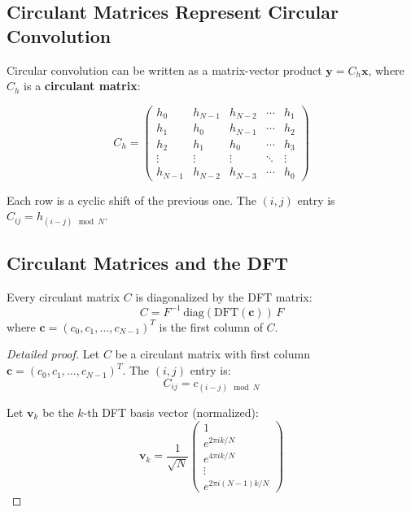 \begin{notechapter}
\subsection{Circulant Matrices Represent Circular Convolution}

Circular convolution can be written as a matrix-vector product 
$\mathbf{y} = C_h \mathbf{x}$, where $C_h$ is a \textbf{circulant 
matrix}:

\begin{equation}
C_h = \begin{pmatrix}
h_0 & h_{N-1} & h_{N-2} & \cdots & h_1 \\
h_1 & h_0 & h_{N-1} & \cdots & h_2 \\
h_2 & h_1 & h_0 & \cdots & h_3 \\
\vdots & \vdots & \vdots & \ddots & \vdots \\
h_{N-1} & h_{N-2} & h_{N-3} & \cdots & h_0
\end{pmatrix}
\end{equation}

Each row is a cyclic shift of the previous one. The $(i,j)$ entry is 
$C_{ij} = h_{(i-j) \mod N}$.

\subsection{Circulant Matrices and the DFT}

\begin{theorem}
\label{dft-to-gnn:thm:circulant-eigenvectors}
Every circulant matrix $C$ is diagonalized by the DFT matrix:
\begin{equation}
C = F^{-1} \, \text{diag}(\text{DFT}(\mathbf{c})) \, F
\end{equation}
where $\mathbf{c} = (c_0, c_1, \ldots, c_{N-1})^T$ is the first column 
of $C$.
\end{theorem}

\begin{proof}[Detailed proof]
Let $C$ be a circulant matrix with first column $\mathbf{c} = 
(c_0, c_1, \ldots, c_{N-1})^T$. The $(i,j)$ entry is:
\[
C_{ij} = c_{(i-j) \mod N}
\]

Let $\mathbf{v}_k$ be the $k$-th DFT basis vector (normalized):
\[
\mathbf{v}_k = \frac{1}{\sqrt{N}} 
\begin{pmatrix}
1 \\ e^{2\pi i k/N} \\ e^{4\pi i k/N} \\ \vdots \\ e^{2\pi i (N-1)k/N}
\end{pmatrix}
\]


\end{proof}
\end{notechapter}
